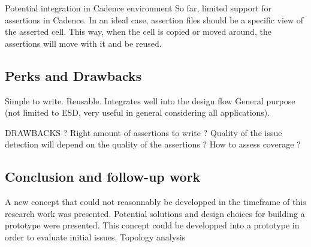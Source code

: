 Potential integration in Cadence environment
So far, limited support for assertions in Cadence.
In an ideal case, assertion files should be a specific view of the asserted cell.
This way, when the cell is copied or moved around, the assertions will move with it and be reused.

\subsection{Perks and Drawbacks}

Simple to write.
Reusable.
Integrates well into the design flow
General purpose (not limited to ESD, very useful in general considering all applications).

DRAWBACKS ?
Right amount of assertions to write ?
Quality of the issue detection will depend on the quality of the assertions ?
How to assess coverage ?


\subsection{Conclusion and follow-up work}

A new concept that could not reasonnably be developped in the timeframe of this research work was presented.
Potential solutions and design choices for building a prototype were presented.
This concept could be developped into a prototype in order to evaluate initial issues.
Topology analysis
